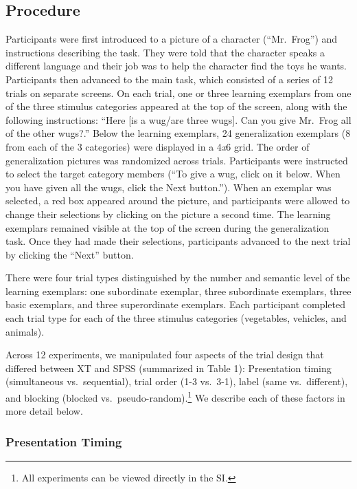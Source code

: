 \documentclass[english,floatsintext,man]{apa6}
\theoremstyle{definition}
\theoremstyle{definition}
\theoremstyle{definition}
\theoremstyle{remark}
\begin{document}
\subsection{Procedure}\label{procedure}

Participants were first introduced to a picture of a character
(\enquote{Mr.~Frog}) and instructions describing the task. They were
told that the character speaks a different language and their job was to
help the character find the toys he wants. Participants then advanced to
the main task, which consisted of a series of 12 trials on separate
screens. On each trial, one or three learning exemplars from one of the
three stimulus categories appeared at the top of the screen, along with
the following instructions: \enquote{Here {[}is a wug/are three wugs{]}.
Can you give Mr.~Frog all of the other wugs?.} Below the learning
exemplars, 24 generalization exemplars (8 from each of the 3 categories)
were displayed in a 4\emph{x}6 grid. The order of generalization
pictures was randomized across trials. Participants were instructed to
select the target category members (\enquote{To give a wug, click on it
below. When you have given all the wugs, click the Next button.}). When
an exemplar was selected, a red box appeared around the picture, and
participants were allowed to change their selections by clicking on the
picture a second time. The learning exemplars remained visible at the
top of the screen during the generalization task. Once they had made
their selections, participants advanced to the next trial by clicking
the \enquote{Next} button.

There were four trial types distinguished by the number and semantic
level of the learning exemplars: one subordinate exemplar, three
subordinate exemplars, three basic exemplars, and three superordinate
exemplars. Each participant completed each trial type for each of the
three stimulus categories (vegetables, vehicles, and animals).

Across 12 experiments, we manipulated four aspects of the trial design
that differed between XT and SPSS (summarized in Table 1): Presentation
timing (simultaneous vs.~sequential), trial order (1-3 vs.~3-1), label
(same vs.~different), and blocking (blocked
vs.~pseudo-random).\footnote{All experiments can be viewed directly in the SI.}
We describe each of these factors in more detail below.

\subsubsection{Presentation Timing}\label{presentation-timing}
\end{document}
